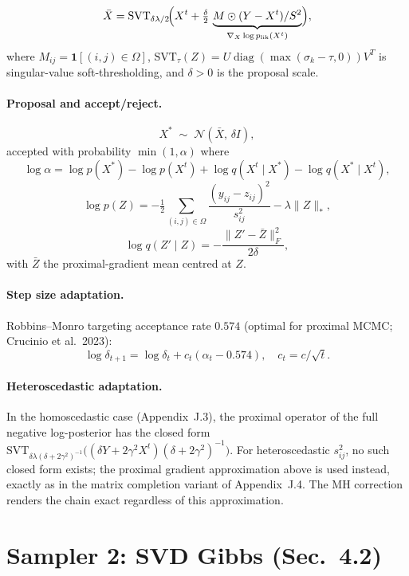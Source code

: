 \documentclass[11pt]{article}
\begin{document}
\[
  \bar X = \mathrm{SVT}_{\delta\lambda/2}\!\Bigl(
    X^t + \tfrac{\delta}{2}\, \underbrace{M\odot(Y-X^t)/S^2}_{
      \nabla_X\log p_{\text{lik}}(X^t)}
  \Bigr),
\]
where $M_{ij}=\mathbf{1}[(i,j)\in\Omega]$, $\mathrm{SVT}_\tau(Z)=
U\operatorname{diag}(\max(\sigma_k-\tau,0))V^T$ is singular-value
soft-thresholding, and $\delta>0$ is the proposal scale.

\paragraph{Proposal and accept/reject.}
\[
  X^* \;\sim\; \mathcal{N}(\bar X,\, \delta I),
\]
accepted with probability $\min(1,\alpha)$ where
\[
  \log\alpha
  = \log p(X^*) - \log p(X^t)
  + \log q(X^t\mid X^*) - \log q(X^*\mid X^t),
\]
\[
  \log p(Z)
  = -\tfrac{1}{2}\sum_{(i,j)\in\Omega}\frac{(y_{ij}-z_{ij})^2}{s_{ij}^2}
  - \lambda\|Z\|_*,
\]
\[
  \log q(Z'\mid Z) = -\frac{\|Z'-\bar Z\|_F^2}{2\delta},
\]
with $\bar Z$ the proximal-gradient mean centred at $Z$.

\paragraph{Step size adaptation.}
Robbins--Monro targeting acceptance rate $0.574$ (optimal for proximal MCMC;
Crucinio et al.\ 2023):
\[
  \log\delta_{t+1} = \log\delta_t + c_t(\alpha_t - 0.574),
  \quad c_t = c/\sqrt{t}.
\]

\paragraph{Heteroscedastic adaptation.}
In the homoscedastic case (Appendix~J.3), the proximal operator of the full
negative log-posterior has the closed form
$\mathrm{SVT}_{\delta\lambda(\delta+2\gamma^2)^{-1}}
 \bigl((\delta Y + 2\gamma^2 X^t)(\delta+2\gamma^2)^{-1}\bigr)$.
For heteroscedastic $s_{ij}^2$, no such closed form exists; the proximal
gradient approximation above is used instead, exactly as in the matrix
completion variant of Appendix~J.4.  The MH correction renders the chain
exact regardless of this approximation.


\section*{Sampler 2: SVD Gibbs (Sec.\ 4.2)}
\label{sec:gibbs}
\end{document}
